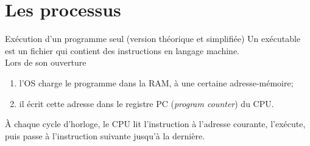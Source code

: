 \documentclass[10pt]{beamer}
\begin{document}
\section{Les processus}
\begin{frame}{Exécution d'un programme seul (version théorique et simplifiée)}
Un \alert{exécutable} est un fichier qui contient des instructions en langage machine.\\
Lors de son ouverture
\begin{enumerate}[--]
	\item l'OS charge le programme dans la RAM, à une certaine adresse-mémoire;
    \item il écrit cette adresse dans le registre PC (\textit{program counter}) du CPU.
\end{enumerate}
À chaque cycle d'horloge, le CPU lit l'instruction à l'adresse courante, l'exécute, puis passe à l'instruction suivante jusqu'à la dernière.
\end{frame}
\end{document}
